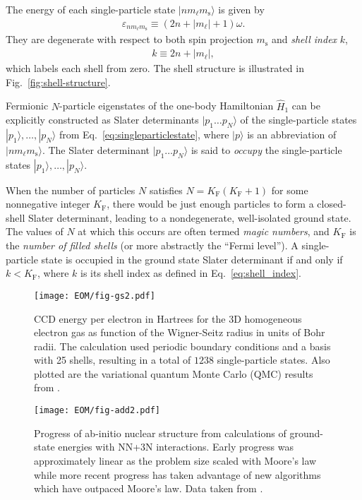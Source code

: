 \documentclass[thesis.tex]{subfiles}
\begin{document}
The energy of each single-particle state $|n m_\ell m_{\mathrm{s}}\rangle$ is given by
\begin{align} \label{eq:energysingleparticlestate}
  \varepsilon_{n m_\ell m_{\mathrm{s}}} \equiv (2 n + |m_\ell| + 1) \omega.
\end{align}
They are degenerate with respect to both spin projection $m_{\mathrm{s}}$ and \textit{shell index} $k$,
\begin{align} \label{eq:shell_index}
  k \equiv 2 n + |m_\ell|,
\end{align}
which labels each shell from zero.  The shell structure is illustrated in Fig.\ \ref{fig:shell-structure}.

Fermionic $N$-particle eigenstates of the one-body Hamiltonian $\hat{H}_1$ can be explicitly constructed as Slater determinants $|p_1 \ldots p_N\rangle$ of the single-particle states $|p_1\rangle, \ldots, |p_N\rangle$ from Eq.\ \eqref{eq:singleparticlestate}, where $|p\rangle$ is an abbreviation of $|n m_\ell m_{\mathrm{s}}\rangle$.  The Slater determinant $|p_1 \ldots p_N\rangle$ is said to \textit{occupy} the single-particle states $|p_1\rangle, \ldots, |p_N\rangle$.

When the number of particles $N$ satisfies $N = K_{\mathrm{F}} (K_{\mathrm{F}} + 1)$ for some nonnegative integer $K_{\mathrm{F}}$, there would be just enough particles to form a closed-shell Slater determinant, leading to a nondegenerate, well-isolated ground state.  The values of $N$ at which this occurs are often termed \textit{magic numbers}, and $K_{\mathrm{F}}$ is the \textit{number of filled shells} (or more abstractly the ``Fermi level'').  A single-particle state is occupied in the ground state Slater determinant if and only if $k < K_{\mathrm{F}}$, where $k$ is its shell index as defined in Eq.\ \eqref{eq:shell_index}.





\begin{figure}[h]
  \texttt{[image: EOM/fig-gs2.pdf]}
  \caption{CCD energy per electron in Hartrees for the 3D homogeneous electron gas as function of the Wigner-Seitz radius in units of Bohr radii. The calculation used periodic boundary conditions and a basis with 25 shells, resulting in a total of $1238$ single-particle states. Also plotted are the variational quantum Monte Carlo (QMC) results from \cite{LOPEZ2006}.}
  \label{fig:QDground}
\end{figure}

\begin{figure}[h]
  \centering
  \texttt{[image: EOM/fig-add2.pdf]}
  \caption{Progress of ab-initio nuclear structure from calculations of ground-state energies with NN+3N interactions.  Early progress was approximately linear as the problem size scaled with Moore's law while more recent progress has taken advantage of new algorithms which have outpaced Moore's law.  Data taken from \cite{HERGERTPRIVATE}.}
  \label{fig:QDadd}
\end{figure}
\end{document}
